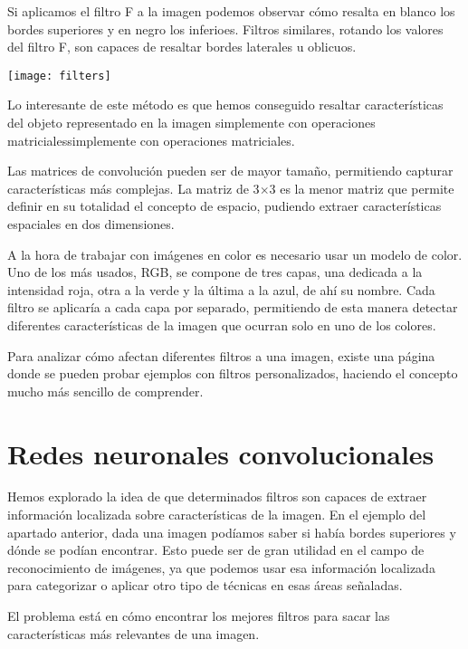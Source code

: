 Si aplicamos el filtro F a la imagen podemos observar cómo resalta en blanco los bordes superiores y en negro los inferioes. Filtros similares, rotando los valores del filtro F, son capaces de resaltar bordes laterales u oblicuos.

\begin{center}
  \texttt{[image: filters]}
\end{center}

Lo interesante de este método es que hemos conseguido resaltar características del objeto representado en la imagen simplemente con operaciones matricialessimplemente con operaciones matriciales.

Las matrices de convolución pueden ser de mayor tamaño, permitiendo capturar características más complejas. La matriz de 3$\times$3 es la menor matriz que permite definir en su totalidad el concepto de espacio, pudiendo extraer características espaciales en dos dimensiones.

A la hora de trabajar con imágenes en color es necesario usar un modelo de color. Uno de los más usados, RGB, se compone de tres capas, una dedicada a la intensidad roja, otra a la verde y la última a la azul, de ahí su nombre. Cada filtro se aplicaría a cada capa por separado, permitiendo de esta manera detectar diferentes características de la imagen que ocurran solo en uno de los colores.

Para analizar cómo afectan diferentes filtros a una imagen, existe una página \parencite{visualizer_convolution} donde se pueden probar ejemplos con filtros personalizados, haciendo el concepto mucho más sencillo de comprender.

\section{Redes neuronales convolucionales}
\label{sec:conv-net}

Hemos explorado la idea de que determinados filtros son capaces de extraer información localizada sobre características de la imagen. En el ejemplo del apartado anterior, dada una imagen podíamos saber si había bordes superiores y dónde se podían encontrar. Esto puede ser de gran utilidad en el campo de reconocimiento de imágenes, ya que podemos usar esa información localizada para categorizar o aplicar otro tipo de técnicas en esas áreas señaladas.

El problema está en cómo encontrar los mejores filtros para sacar las características más relevantes de una imagen.

